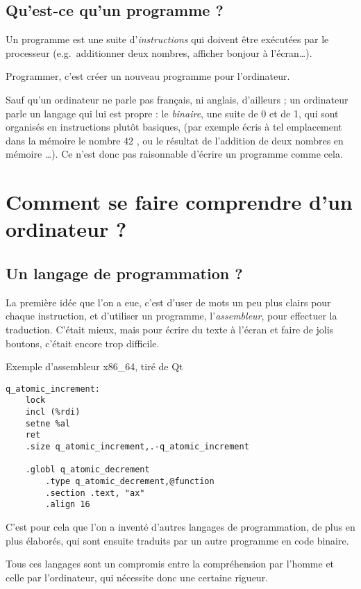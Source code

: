 \subsection{Qu'est-ce qu'un programme ?}
Un programme est une suite d'\emph{instructions} qui doivent être exécutées par le processeur
(e.g.\ additionner deux nombres, afficher \og bonjour \fg{} à l'écran…).

Programmer, c'est créer un nouveau programme pour l'ordinateur.

Sauf qu'un ordinateur ne parle pas français, ni anglais, d'ailleurs ;
un ordinateur parle un langage qui lui est propre :
le \emph{binaire}, une suite de 0 et de 1,
qui sont organisés en instructions plutôt basiques,
(par exemple \og écris à tel emplacement dans la mémoire le
nombre 42 \fg{}, ou \og le résultat de l'addition de deux nombres en mémoire \fg{}…).
Ce n'est donc pas raisonnable d'écrire un programme comme cela.
\section{Comment se faire comprendre d'un ordinateur ?}
\subsection{Un langage de programmation ?}
La première idée que l'on a eue,
c’est d’user de mots un peu plus clairs pour chaque instruction,
et d'utiliser un programme, l'\emph{assembleur}, pour effectuer la traduction.
C'était mieux, mais pour écrire du texte à l'écran et faire de jolis boutons,
c'était encore trop difficile.
\begin{listing}[h] %
\caption{Exemple d'assembleur x86\_64, tiré de Qt}
\begin{verbatim}
q_atomic_increment:
    lock
    incl (%rdi)
    setne %al
    ret
    .size q_atomic_increment,.-q_atomic_increment

    .globl q_atomic_decrement
        .type q_atomic_decrement,@function
        .section .text, "ax"
        .align 16
\end{verbatim}
\end{listing}

C'est pour cela que l'on a inventé d'autres langages de programmation,
de plus en plus élaborés,
qui sont ensuite traduits par un autre programme en code binaire.

Tous ces langages sont un compromis entre la compréhension par l'homme et celle par l'ordinateur, qui nécessite donc une certaine rigueur.

